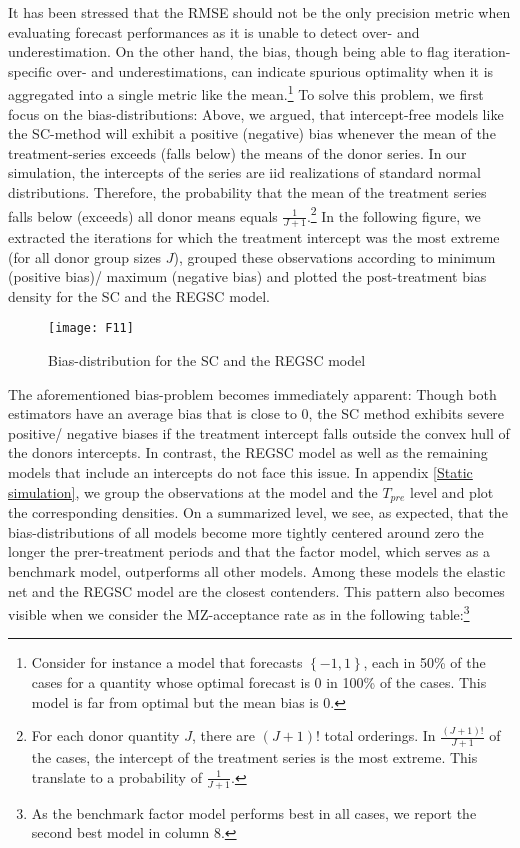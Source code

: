 It has been stressed that the \ac{RMSE} should not be the only precision metric when evaluating  forecast performances as it is unable to detect over- and underestimation. On the other hand, the bias, though being able to flag iteration-specific over- and underestimations, can indicate spurious optimality when it is aggregated into a single metric like the mean.\footnote{Consider for instance a model that forecasts $\left\lbrace -1,1\right\rbrace $, each in 50\% of the cases for a quantity whose optimal forecast is 0 in 100\% of the cases. This model is far from optimal but the mean bias is 0.} To solve this problem, we first focus on the bias-distributions: Above, we argued, that intercept-free models like the \ac{SC}-method will exhibit a positive (negative) bias whenever the mean of the treatment-series exceeds (falls below) the means of the donor series. In our simulation, the intercepts of the series are \ac{iid} realizations of standard normal distributions. Therefore, the probability that the mean of the treatment series falls below (exceeds) all donor means equals $\frac{1}{J+1}$.\footnote{For each donor quantity $J$, there are $(J+1)!$ total orderings. In $\frac{(J+1)!}{J+1}$ of the cases, the intercept of the treatment series is the most extreme. This translate to a probability of $\frac{1}{J+1}$. } In the following figure, we extracted the iterations for which the treatment intercept was the most extreme (for all donor group sizes $J$), grouped these observations according to minimum (positive bias)/ maximum (negative bias) and plotted the post-treatment bias density for the \ac{SC} and the \ac{REGSC} model. 
\begin{figure}[H]
	\centering
	\texttt{[image: F11]}
	\caption{Bias-distribution for the SC and the REGSC model}
	\label{F_09}
\end{figure}

The aforementioned bias-problem becomes immediately apparent: Though both estimators have an average bias that is close to 0, the \ac{SC} method exhibits severe positive/ negative biases if the treatment intercept falls outside the convex hull of the donors intercepts. In contrast, the \ac{REGSC} model as well as the remaining models that include an intercepts do not face this issue. In appendix \ref{Static simulation}, we group the observations at the model and the $T_{pre}$ level and plot the corresponding densities. On a summarized level, we see, as expected, that the bias-distributions of all models become more tightly centered around zero the longer the prer-treatment periods and that the factor model, which serves as a benchmark model, outperforms all other models. Among these models the elastic net and the \ac{REGSC} model are the closest contenders. This pattern also becomes visible when we consider the \ac{MZ}-acceptance rate as in the following table:\footnote{As the benchmark factor model performs best in all cases, we report the second best model in column 8.}

